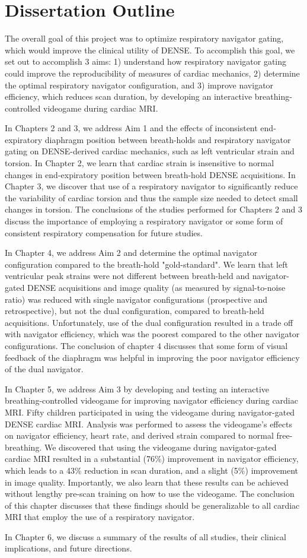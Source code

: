 \section{Dissertation Outline}
	The overall goal of this project was to optimize respiratory navigator gating, which would improve the clinical utility of DENSE. To accomplish this goal, we set out to accomplish 3 aims: 1) understand how respiratory navigator gating could improve the reproducibility of measures of cardiac mechanics, 2) determine the optimal respiratory navigator configuration, and 3) improve navigator efficiency, which reduces scan duration, by developing an interactive breathing-controlled videogame during cardiac MRI.
	
	\indent In Chapters 2 and 3, we address Aim 1 and the effects of inconsistent end-expiratory diaphragm position between breath-holds and respiratory navigator gating on DENSE-derived cardiac mechanics, such as left ventricular strain and torsion. In Chapter 2, we learn that cardiac strain is insensitive to normal changes in end-expiratory position between breath-hold DENSE acquisitions. In Chapter 3, we discover that use of a respiratory navigator to significantly reduce the variability of cardiac torsion and thus the sample size needed to detect small changes in torsion. The conclusions of the studies performed for Chapters 2 and 3 discuss the importance of employing a respiratory navigator or some form of consistent respiratory compensation for future studies.
	
	\indent In Chapter 4, we address Aim 2 and determine the optimal navigator configuration compared to the breath-hold "gold-standard". We learn that left ventricular peak strains were not different between breath-held and navigator-gated DENSE acquisitions and image quality (as measured by signal-to-noise ratio) was reduced with single navigator configurations (prospective and retrospective), but not the dual configuration, compared to breath-held acquisitions. Unfortunately, use of the dual configuration resulted in a trade off with navigator efficiency, which was the poorest compared to the other navigator configurations. The conclusion of chapter 4 discusses that some form of visual feedback of the diaphragm was helpful in improving the poor navigator efficiency of the dual navigator.
	
	\indent In Chapter 5, we address Aim 3 by developing and testing an interactive breathing-controlled videogame for improving navigator efficiency during cardiac MRI. Fifty children participated in using the videogame during navigator-gated DENSE cardiac MRI. Analysis was performed to assess the videogame's effects on navigator efficiency, heart rate, and derived strain compared to normal free-breathing. We discovered that using the videogame during navigator-gated cardiac MRI resulted in a substantial (76\%) improvement in navigator efficiency, which leads to a 43\% reduction in scan duration, and a slight (5\%) improvement in image quality. Importantly, we also learn that these results can be achieved without lengthy pre-scan training on how to use the videogame. The conclusion of this chapter discusses that these findings should be generalizable to all cardiac MRI that employ the use of a respiratory navigator.
	
	\indent In Chapter 6, we discuss a summary of the results of all studies, their clinical implications, and future directions.

